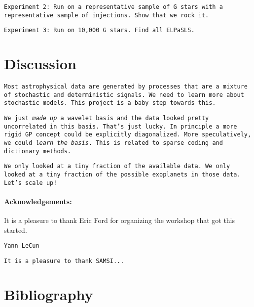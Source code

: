 \documentclass[12pt,letterpaper]{article}
\newcommand{\warning}[1]{\texttt{#1}}
\begin{document}
\warning{Experiment 2: Run on a representative sample of G stars with a representative sample of injections.
         Show that we rock it.}

\warning{Experiment 3: Run on 10,000 G stars.
         Find all ELPaSLS.}

\section{Discussion}

\warning{Most astrophysical data are generated by processes that are a mixture of
         stochastic and deterministic signals.
         We need to learn more about stochastic models.
         This project is a baby step towards this.}

\warning{We just \emph{made up} a wavelet basis and the data looked pretty uncorrelated in this basis.
         That's just lucky.
         In principle a more rigid GP concept could be explicitly diagonalized.
         More speculatively, we could \emph{learn the basis}.
         This is related to sparse coding and dictionary methods.}

\warning{We only looked at a tiny fraction of the available data.
         We only looked at a tiny fraction of the possible exoplanets in those data.
         Let's scale up!}

\paragraph{Acknowledgements:}
It is a pleasure to thank Eric Ford for organizing the workshop that got this started.

\warning{Yann LeCun}

\warning{It is a pleasure to thank SAMSI...}

\section*{Bibliography}
\end{document}
